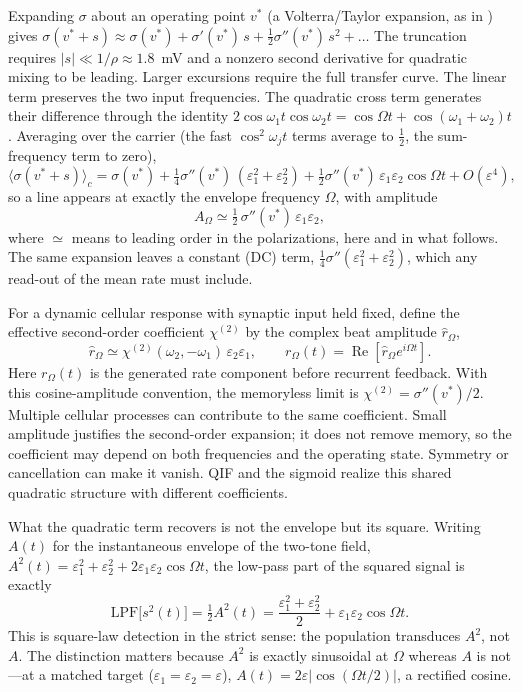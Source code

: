 \documentclass[11pt,a4paper]{article}
\newcommand{\Sig}{\sigma}
\newcommand{\half}{\tfrac{1}{2}}
\begin{document}
Expanding $\Sig$ about an operating point $v^*$ (a Volterra/Taylor expansion, as
in \cite{ruffini2025ham}) gives
$\Sig(v^*+s)\approx\Sig(v^*)+\Sig'(v^*)\,s+\half\Sig''(v^*)\,s^2+\dots$
The truncation requires $|s|\ll1/\rho\approx1.8$~mV and a nonzero second derivative
for quadratic mixing to be leading. Larger excursions require the full transfer curve.
The linear term preserves the two input frequencies. The quadratic cross term
generates their difference through the identity
$2\cos\omega_1t\cos\omega_2t=\cos\Omega t+\cos(\omega_1+\omega_2)t$.
Averaging over the carrier (the fast
$\cos^2\omega_jt$ terms average to $\half$, the sum-frequency term to zero),
\begin{equation}
\big\langle\Sig(v^*+s)\big\rangle_c
=\Sig(v^*)+\tfrac14\Sig''(v^*)\,(\varepsilon_1^2+\varepsilon_2^2)
+\tfrac12\Sig''(v^*)\,\varepsilon_1\varepsilon_2\cos\Omega t+O(\varepsilon^4),
\label{eq:taylor}
\end{equation}
so a line appears at exactly the envelope frequency $\Omega$, with amplitude
\begin{equation}
A_\Omega\simeq\half\,\Sig''(v^*)\,\varepsilon_1\varepsilon_2 ,
\label{eq:demod}
\end{equation}
where $\simeq$ means to leading order in the polarizations, here and in what follows. The
same expansion leaves a constant (DC) term, $\tfrac14\Sig''(\varepsilon_1^2+\varepsilon_2^2)$,
which any read-out of the mean rate must include.

For a dynamic cellular response with synaptic input held fixed, define the
effective second-order coefficient $\chi^{(2)}$ by the complex beat amplitude
$\widehat r_\Omega$,
\[
\widehat r_\Omega\simeq\chi^{(2)}(\omega_2,-\omega_1)\,
\varepsilon_2\varepsilon_1,\qquad
r_\Omega(t)=\operatorname{Re}\!\left[\widehat r_\Omega e^{i\Omega t}\right].
\]
Here $r_\Omega(t)$ is the generated rate component before recurrent feedback.
With this cosine-amplitude convention, the memoryless limit is
$\chi^{(2)}=\Sig''(v^*)/2$. Multiple cellular processes can contribute to the same
coefficient. Small amplitude justifies the second-order expansion; it does not
remove memory, so the coefficient may depend on both frequencies and the
operating state. Symmetry or cancellation can make it vanish. QIF and the sigmoid
realize this shared quadratic structure with different coefficients.

What the quadratic term recovers is not the envelope but its square. Writing $A(t)$ for
the instantaneous envelope of the two-tone field,
$A^2(t)=\varepsilon_1^2+\varepsilon_2^2+2\varepsilon_1\varepsilon_2\cos\Omega t$, the
low-pass part of the squared signal is exactly
\begin{equation}
\mathrm{LPF}\big[s^2(t)\big]=\half A^2(t)
=\frac{\varepsilon_1^2+\varepsilon_2^2}{2}+\varepsilon_1\varepsilon_2\cos\Omega t .
\label{eq:sqenv}
\end{equation}
This is square-law detection in the strict sense: the population transduces $A^2$, not
$A$. The distinction matters because $A^2$ is exactly sinusoidal at $\Omega$
whereas $A$ is not---at a matched target ($\varepsilon_1=\varepsilon_2=\varepsilon$),
$A(t)=2\varepsilon|\cos(\Omega t/2)|$, a rectified cosine.
\end{document}
